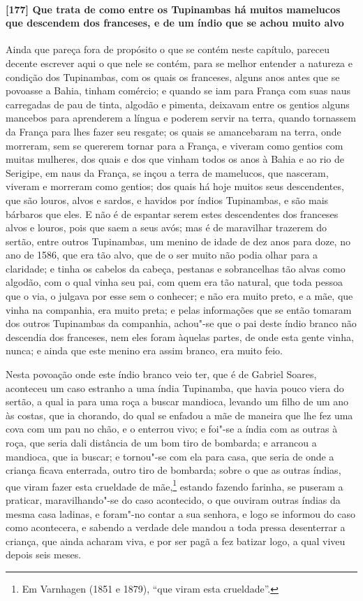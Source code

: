 \begin{linenumbers}
\paragraph{[177] Que trata de como entre os Tupinambas há muitos mamelucos que descendem dos
franceses, e de um índio que se achou muito alvo}\quad
Ainda que pareça fora de propósito o que se contém neste capítulo, pareceu decente
escrever aqui o que nele se contém, para se melhor entender a natureza e condição dos
Tupinambas, com os quais os franceses, alguns anos antes que se povoasse a Bahia, tinham
comércio; e quando se iam para França com suas naus carregadas de pau de tinta, algodão e
pimenta, deixavam entre os gentios alguns mancebos para aprenderem a língua e poderem
servir na terra, quando tornassem da França para lhes fazer seu resgate; os quais se
amancebaram na terra, onde morreram, sem se quererem tornar para a França, e viveram como
gentios com muitas mulheres, dos quais e dos que vinham todos os anos à Bahia e ao rio de
Serigipe, em naus da França, se inçou a terra de mamelucos, que nasceram, viveram e
morreram como gentios; dos quais há hoje muitos seus descendentes, que são louros, alvos e
sardos, e havidos por índios Tupinambas, e são mais bárbaros que eles. E não é de espantar
serem estes descendentes dos franceses alvos e louros, pois que saem a seus avós; mas é de
maravilhar trazerem do sertão, entre outros Tupinambas, um menino de idade de dez anos
para doze, no ano de 1586, que era tão alvo, que de o ser muito não podia olhar para a
claridade; e tinha os cabelos da cabeça, pestanas e sobrancelhas tão alvas como algodão,
com o qual vinha seu pai, com quem era tão natural, que toda pessoa que o via, o julgava
por esse sem o conhecer; e não era muito preto, e a mãe, que vinha na companhia, era muito
preta; e pelas informações que se então tomaram dos outros Tupinambas da companhia,
achou"-se que o pai deste índio branco não descendia dos franceses, nem eles foram àquelas
partes, de onde esta gente vinha, nunca; e ainda que este menino era assim branco, era
muito feio.

Nesta povoação onde este índio branco veio ter, que é de Gabriel Soares, aconteceu um caso
estranho a uma índia Tupinamba, que havia pouco viera do sertão, a qual ia para uma roça a
buscar mandioca, levando um filho de um ano às costas, que ia chorando, do qual se enfadou
a mãe de maneira que lhe fez uma cova com um pau no chão, e o enterrou vivo; e foi"-se a
índia com as outras à roça, que seria dali distância de um bom tiro de bombarda; e
arrancou a mandioca, que ia buscar; e tornou"-se com ela para casa, que seria de onde a
criança ficava enterrada, outro tiro de bombarda; sobre o que as outras índias, que viram
fazer esta crueldade de mãe,\footnote{ Em Varnhagen (1851 e 1879), ``que viram esta
crueldade''.} estando fazendo farinha, se puseram a praticar, maravilhando"-se do caso
acontecido, o que ouviram outras índias da mesma casa ladinas, e foram"-no contar a sua
senhora, e logo se informou do caso como acontecera, e sabendo a verdade dele mandou a
toda pressa desenterrar a criança, que ainda acharam viva, e por ser pagã a fez batizar
logo, a qual viveu depois seis meses.


\end{linenumbers}
